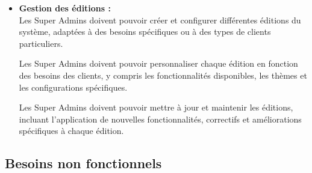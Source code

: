 \begin{itemize}
    \item \textbf{Gestion des éditions :}\\

Les Super Admins doivent pouvoir créer et configurer différentes éditions du système, adaptées à des besoins spécifiques ou à des types de clients particuliers.

Les Super Admins doivent pouvoir personnaliser chaque édition en fonction des besoins des clients, y compris les fonctionnalités disponibles, les thèmes et les configurations spécifiques.

Les Super Admins doivent pouvoir mettre à jour et maintenir les éditions, incluant l'application de nouvelles fonctionnalités, correctifs et améliorations spécifiques à chaque édition.
    
\end{itemize}



\subsection{Besoins non fonctionnels}

